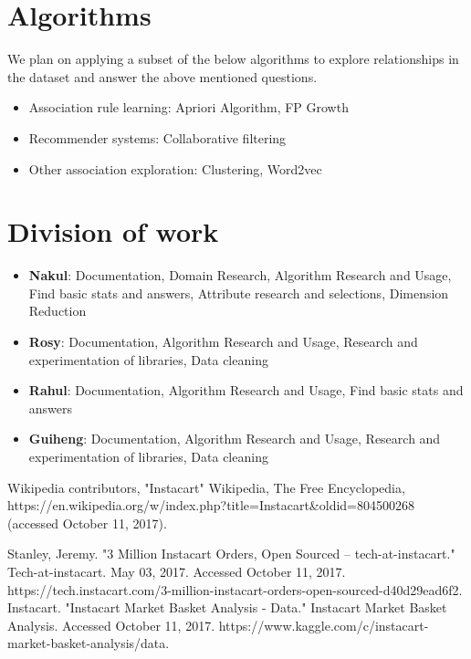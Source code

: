 \documentclass[12pt]{article}
\begin{document}
\section{Algorithms}
We plan on applying a subset of the below algorithms to explore relationships in the dataset and answer the above mentioned questions.

\begin{itemize}
	\item Association rule learning: Apriori Algorithm, FP Growth
	\item Recommender systems: Collaborative filtering
	\item Other association exploration: Clustering, Word2vec 
\end{itemize}
 
\section{Division of work}
\begin{itemize}
	\item \textbf{Nakul}: 
Documentation, Domain Research, Algorithm Research and Usage, Find basic stats and answers, Attribute research and selections, Dimension Reduction
	\item \textbf{Rosy}:
Documentation, Algorithm Research and Usage, Research and experimentation of libraries, Data cleaning
	\item \textbf{Rahul}:
Documentation, Algorithm Research and Usage, Find basic stats and answers 
	\item \textbf{Guiheng}:
Documentation, Algorithm Research and Usage, Research and experimentation of libraries, Data cleaning

\end{itemize}

\begin{thebibliography}{99}

 Wikipedia contributors, "Instacart" Wikipedia, The Free Encyclopedia, https://en.wikipedia.org/w/index.php?title=Instacart\&oldid=804500268 (accessed
October 11, 2017).

 Stanley, Jeremy. "3 Million Instacart Orders, Open Sourced – tech-at-instacart." Tech-at-instacart. May 03, 2017. Accessed October 11, 2017. https://tech.instacart.com/3-million-instacart-orders-open-sourced-d40d29ead6f2.
Instacart. "Instacart Market Basket Analysis - Data." Instacart Market Basket Analysis. Accessed October 11, 2017. https://www.kaggle.com/c/instacart-market-basket-analysis/data.
\end{thebibliography}
\end{document}
